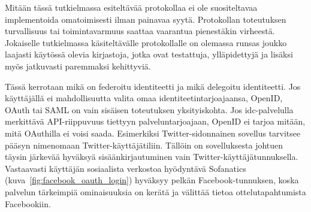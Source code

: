 \documentclass[finnish,gradu]{tktltiki}
\begin{document}
  Mitään tässä tutkielmassa esiteltävää protokollaa ei ole suositeltavaa implementoida omatoimisesti ilman painavaa syytä. Protokollan toteutuksen turvallisuus tai toimintavarmuus saattaa vaarantua pienestäkin virheestä. Jokaiselle tutkielmassa käsiteltävälle protokollalle on olemassa runsas joukko laajasti käytössä olevia kirjastoja, jotka ovat testattuja, ylläpidettyjä ja lisäksi myös jatkuvasti paremmaksi kehittyviä.

  Tässä kerrotaan mikä on federoitu identiteetti ja mikä delegoitu identiteetti.
  Jos käyttäjällä ei mahdollisuutta valita omaa identiteetintarjoajaansa, OpenID, OAuth tai SAML on vain sisäisen toteutuksen yksityiskohta. Jos idc-palvelulla merkittävä API-riippuvuus tiettyyn palveluntarjoajaan, OpenID ei tarjoa mitään, mitä OAuthilla ei voisi saada. Esimerkiksi Twitter-sidonnainen sovellus tarvitsee pääsyn nimenomaan Twitter-käyttäjätiliin. Tällöin on sovelluksesta johtuen täysin järkevää hyväksyä sisäänkirjautuminen vain Twitter-käyttäjätunnuksella. Vastaavasti käyttäjän sosiaalista verkostoa hyödyntävä Sofanatics (kuva~\ref{fig:facebook_oauth_login}) hyväksyy pelkän Facebook-tunnuksen, koska palvelun tärkeimpiä ominaisuuksia on kerätä ja välittää tietoa ottelutapahtumista Facebookiin.
\end{document}
